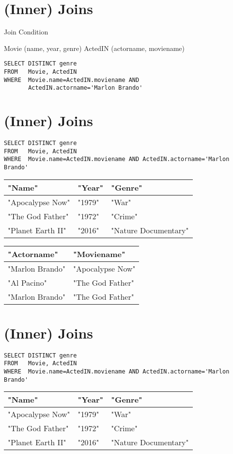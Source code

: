 \documentclass{article}
\begin{document}
\section*{(Inner) Joins}
Join Condition

Movie (name, year, genre)
ActedIN (actorname, moviename)

\begin{verbatim}
SELECT DISTINCT genre
FROM   Movie, ActedIN
WHERE  Movie.name=ActedIN.moviename AND
       ActedIN.actorname='Marlon Brando'
\end{verbatim}

\section*{(Inner) Joins}
\begin{verbatim}
SELECT DISTINCT genre
FROM   Movie, ActedIN
WHERE  Movie.name=ActedIN.moviename AND ActedIN.actorname='Marlon Brando'
\end{verbatim}

\begin{tabular}{lll}
\hline
"Name" & "Year" & "Genre" \\
\hline
"Apocalypse Now" & "1979" & "War" \\
"The God Father" & "1972" & "Crime" \\
"Planet Earth II" & "2016" & "Nature Documentary" \\
\hline
\end{tabular}

\begin{tabular}{ll}
\hline
"Actorname" & "Moviename" \\
\hline
"Marlon Brando" & "Apocalypse Now" \\
"Al Pacino" & "The God Father" \\
"Marlon Brando" & "The God Father" \\
\hline
\end{tabular}

\section*{(Inner) Joins}
\begin{verbatim}
SELECT DISTINCT genre
FROM   Movie, ActedIN
WHERE  Movie.name=ActedIN.moviename AND ActedIN.actorname='Marlon Brando'
\end{verbatim}

\begin{tabular}{lll}
\hline
"Name" & "Year" & "Genre" \\
\hline
"Apocalypse Now" & "1979" & "War" \\
"The God Father" & "1972" & "Crime" \\
"Planet Earth II" & "2016" & "Nature Documentary" \\
\hline
\end{tabular}
\end{document}
